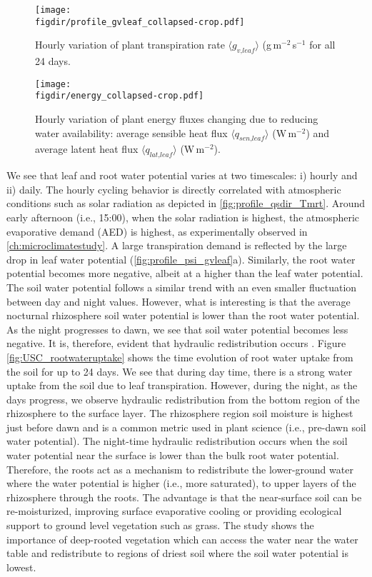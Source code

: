 \begin{figure}[p]
	\centering
	\texttt{[image: \\figdir/profile\_gvleaf\_collapsed-crop.pdf]}
	\caption{Hourly variation of plant transpiration rate $\langle g_{\textit{v,leaf}} \rangle$ (g\,m$^{-2}$\,s$^{-1}$ for all 24 days.}
	\label{fig:profile_gvleaf_collapsed}
\end{figure}

\begin{figure}[p]
	\centering
	\texttt{[image: \\figdir/energy\_collapsed-crop.pdf]}
	\caption{Hourly variation of plant energy fluxes changing due to reducing water availability:  average sensible heat flux $\langle q_{\textit{sen,leaf}} \rangle$ (W\,m$^{-2}$) and  average latent heat flux $\langle q_{\textit{lat,leaf}} \rangle$ (W\,m$^{-2}$). }
	\label{fig:energy_collapsed}
\end{figure}

We see that leaf and root water potential varies at two timescales: i) hourly and ii) daily. The hourly cycling behavior is directly correlated with atmospheric conditions such as solar radiation as depicted in \cref{fig:profile_qsdir_Tmrt}. Around early afternoon (i.e., 15:00), when the solar radiation is highest, the atmospheric evaporative demand (AED) is highest, as experimentally observed in \cref{ch:microclimatestudy}. A large transpiration demand is reflected by the large drop in leaf water potential (\cref{fig:profile_psi_gvleaf}a). Similarly, the root water potential becomes more negative, albeit at a higher than the leaf water potential. The soil water potential follows a similar trend with an even smaller fluctuation between day and night values. However, what is interesting is that the average nocturnal rhizosphere soil water potential is lower than the root water potential. As the night progresses to dawn, we see that soil water potential becomes less negative. It is, therefore, evident that hydraulic redistribution occurs \citep{Volpe2013, Huang2017}. Figure \cref{fig:USC_rootwateruptake} shows the time evolution of root water uptake from the soil for up to 24 days. We see that during day time, there is a strong water uptake from the soil due to leaf transpiration. However, during the night, as the days progress, we observe hydraulic redistribution from the bottom region of the rhizosphere to the surface layer. The rhizosphere region soil moisture is highest just before dawn and is a common metric used in plant science (i.e., pre-dawn soil water potential). The night-time hydraulic redistribution occurs when the soil water potential near the surface is lower than the bulk root water potential. Therefore, the roots act as a mechanism to redistribute the lower-ground water where the water potential is higher (i.e., more saturated), to upper layers of the rhizosphere through the roots. The advantage is that the near-surface soil can be re-moisturized, improving surface evaporative cooling or providing ecological support to ground level vegetation such as grass. The study shows the importance of deep-rooted vegetation which can access the water near the water table and redistribute to regions of driest soil where the soil water potential is lowest.

